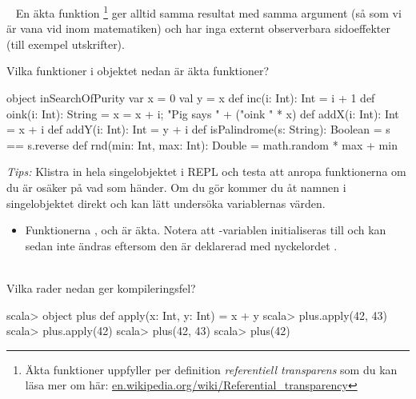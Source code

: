 
\QUESTBEGIN

\Task  \what~  En äkta funktion%
\footnote{Äkta funktioner uppfyller per definition  \textit{referentiell transparens}  som du kan läsa mer om här:  \href{https://en.wikipedia.org/wiki/Referential_transparency}{en.wikipedia.org/wiki/Referential\_transparency}}
 ger alltid samma resultat med samma argument (så som vi är vana vid inom matematiken) och har inga externt observerbara sidoeffekter (till exempel utskrifter).

Vilka funktioner i objektet  nedan är äkta funktioner?
\begin{Code}
object inSearchOfPurity {
  var x = 0
  val y = x
  def inc(i: Int): Int = i + 1
  def oink(i: Int): String = { x = x + i; "Pig says " + ("oink " * x) }
  def addX(i: Int): Int = x + i
  def addY(i: Int): Int = y + i
  def isPalindrome(s: String): Boolean = s == s.reverse
  def rnd(min: Int, max: Int): Double = math.random * max + min
}
\end{Code}


\noindent\emph{Tips:} Klistra in hela singelobjektet i REPL och testa att anropa funktionerna om du är osäker på vad som händer. Om du gör  kommer du åt namnen i singelobjektet direkt och kan lätt undersöka variablernas värden.

\SOLUTION

\TaskSolved \what

\begin{itemize}
  \item Funktionerna  ,  och  är äkta. Notera att -variablen initialiseras till  och kan sedan inte ändras eftersom den är deklarerad med nyckelordet .
\end{itemize}

\QUESTEND





\QUESTBEGIN

\Task  \what~ \\
\noindent Vilka rader nedan ger kompileringsfel?

\begin{REPL}
scala> object plus { def apply(x: Int, y: Int) = x + y }
scala> plus.apply(42, 43)
scala> plus.apply(42)
scala> plus(42, 43)
scala> plus(42)
\end{REPL}


